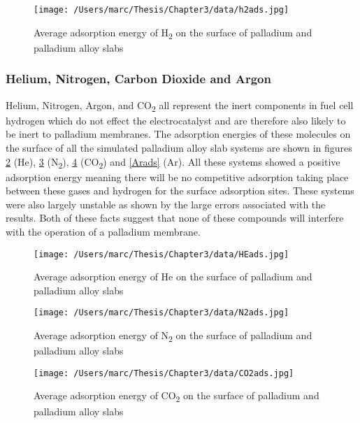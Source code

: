 \begin{landscape}
\begin{figure}
    \centering
    \texttt{[image: /Users/marc/Thesis/Chapter3/data/h2ads.jpg]}
    \caption{Average adsorption energy of H\textsubscript{2} on the surface of palladium and palladium alloy slabs}
    \label{h2ads}
  \end{figure}

\end{landscape}
\subsubsection{Helium, Nitrogen, Carbon Dioxide and Argon}
Helium, Nitrogen, Argon, and CO\textsubscript{2} all represent the inert components in fuel cell hydrogen which do not effect the electrocatalyst and are therefore also likely to be inert to palladium membranes. The adsorption energies of these molecules on the surface of all the simulated palladium alloy slab systems are shown in figures \ref{heads} (He), \ref{n2ads} (N\textsubscript{2}), \ref{co2ads} (CO\textsubscript{2}) and \ref{Arads} (Ar). All these systems showed a positive adsorption energy meaning there will be no competitive adsorption taking place between these gases and hydrogen for the surface adsorption sites. These systems were also largely unstable as shown by the large errors associated with the results. Both of these facts suggest that none of these compounds will interfere with the operation of a palladium membrane.

\begin{figure}
  \centering
  \texttt{[image: /Users/marc/Thesis/Chapter3/data/HEads.jpg]}
  \caption{Average adsorption energy of He on the surface of palladium and palladium alloy slabs}
  \label{heads}

\end{figure}

    \begin{figure}
        \centering
        \texttt{[image: /Users/marc/Thesis/Chapter3/data/N2ads.jpg]}
        \caption{Average adsorption energy of N\textsubscript{2} on the surface of palladium and palladium alloy slabs}
        \label{n2ads}
      \end{figure}

    \begin{figure}
        \centering
        \texttt{[image: /Users/marc/Thesis/Chapter3/data/CO2ads.jpg]}
        \caption{Average adsorption energy of CO\textsubscript{2} on the surface of palladium and palladium alloy slabs}
        \label{co2ads}
      \end{figure}
    
